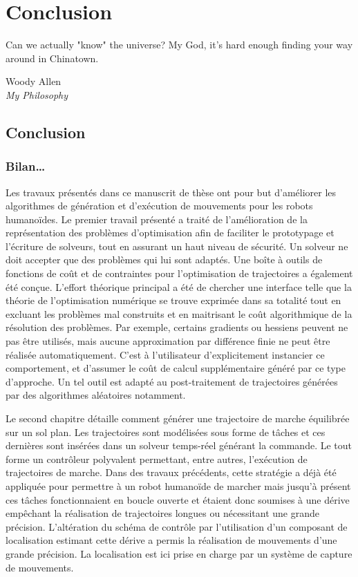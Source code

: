 \chapter{Conclusion}
\label{chap:conclusion}

\epigraph{\foreignlanguage{USenglish}{Can we actually "know" the
    universe? My God, it's hard enough finding your way around in
    Chinatown.}}{Woody Allen\\\emph{My Philosophy}}
\clearpage

\section{Conclusion}
\subsection{Bilan\ldots}

Les travaux présentés dans ce manuscrit de thèse ont pour but
d'améliorer les algorithmes de génération et d'exécution de mouvements
pour les robots humanoïdes. Le premier travail présenté a traité de
l'amélioration de la représentation des problèmes d'optimisation afin
de faciliter le prototypage et l'écriture de solveurs, tout en
assurant un haut niveau de sécurité. Un solveur ne doit accepter que
des problèmes qui lui sont adaptés. Une boîte à outils de fonctions de
coût et de contraintes pour l'optimisation de trajectoires a également
été conçue. L'effort théorique principal a été de chercher une
interface telle que la théorie de l'optimisation numérique se trouve
exprimée dans sa totalité tout en excluant les problèmes mal construits
et en maitrisant le coût algorithmique de la résolution des
problèmes. Par exemple, certains gradients ou hessiens peuvent ne pas
être utilisés, mais aucune approximation par différence finie ne peut
être réalisée automatiquement. C'est à l'utilisateur d'explicitement
instancier ce comportement, et d'assumer le coût de calcul
supplémentaire généré par ce type d'approche. Un tel outil est adapté
au post-traitement de trajectoires générées par des algorithmes
aléatoires notamment.


Le second chapitre détaille comment générer une trajectoire de marche
équilibrée sur un sol plan. Les trajectoires sont modélisées sous
forme de tâches et ces dernières sont insérées dans un solveur
temps-réel générant la commande. Le tout forme un contrôleur
polyvalent permettant, entre autres, l'exécution de trajectoires de
marche. Dans des travaux précédents, cette stratégie a déjà été
appliquée pour permettre à un robot humanoïde de marcher mais jusqu'à
présent ces tâches fonctionnaient en boucle ouverte et étaient donc
soumises à une dérive empêchant la réalisation de trajectoires longues
ou nécessitant une grande précision. L'altération du schéma de
contrôle par l'utilisation d'un composant de localisation estimant
cette dérive a permis la réalisation de mouvements d'une grande
précision. La localisation est ici prise en charge par un système de
capture de mouvements.


